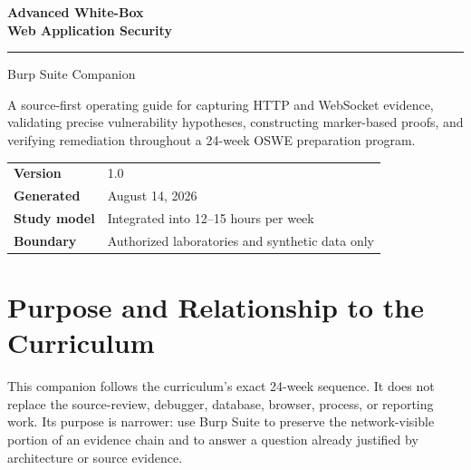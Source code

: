\documentclass[11pt]{article}
\begin{document}
\hypersetup{pageanchor=false}

\begin{titlepage}
  \thispagestyle{empty}
  \pagecolor{Navy}
  \color{white}
  \vspace*{0.10\textheight}
  {\sffamily\bfseries\fontsize{30}{35}\selectfont
    Advanced White-Box\\[3pt]
    Web Application Security\par}
  \vspace{0.5cm}
  {\color{Gold}\rule{0.52\textwidth}{2.2pt}}\par
  \vspace{0.55cm}
  {\sffamily\fontsize{21}{26}\selectfont Burp Suite Companion\par}
  \vspace{1.1cm}
  \begin{tcolorbox}[
    width=0.87\textwidth,
    colback=white!7!Navy,
    colframe=white!35!Navy,
    coltext=white,
    boxrule=0.8pt]
    A source-first operating guide for capturing HTTP and WebSocket evidence,
    validating precise vulnerability hypotheses, constructing marker-based
    proofs, and verifying remediation throughout a 24-week OSWE preparation
    program.
  \end{tcolorbox}
  \vfill
  \begin{tabularx}{0.87\textwidth}{@{}L{0.25\textwidth}Y@{}}
    \color{Gold}\sffamily\bfseries Version & 1.0 \\
    \color{Gold}\sffamily\bfseries Generated & August 14, 2026 \\
    \color{Gold}\sffamily\bfseries Study model & Integrated into 12--15 hours per week \\
    \color{Gold}\sffamily\bfseries Boundary & Authorized laboratories and synthetic data only \\
  \end{tabularx}
  \vspace*{0.06\textheight}
\end{titlepage}
\nopagecolor
\color{black}

\hypersetup{pageanchor=true}
\tableofcontents
\clearpage
{}

\section{Purpose and Relationship to the Curriculum}

This companion follows the curriculum's exact 24-week sequence. It does not
replace the source-review, debugger, database, browser, process, or reporting
work. Its purpose is narrower: use Burp Suite to preserve the network-visible
portion of an evidence chain and to answer a question already justified by
architecture or source evidence.
\end{document}
